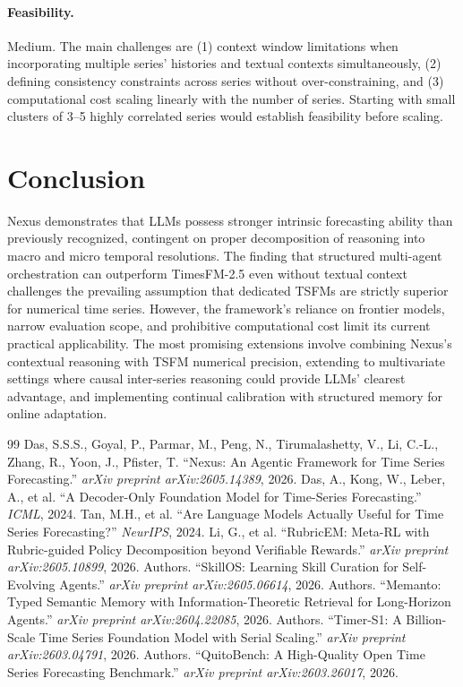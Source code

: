 \documentclass[11pt,a4paper]{article}
\begin{document}
\paragraph{Feasibility.} Medium. The main challenges are (1) context window limitations when incorporating multiple series' histories and textual contexts simultaneously, (2) defining consistency constraints across series without over-constraining, and (3) computational cost scaling linearly with the number of series. Starting with small clusters of 3--5 highly correlated series would establish feasibility before scaling.

\section{Conclusion}

Nexus demonstrates that LLMs possess stronger intrinsic forecasting ability than previously recognized, contingent on proper decomposition of reasoning into macro and micro temporal resolutions. The finding that structured multi-agent orchestration can outperform TimesFM-2.5 even without textual context challenges the prevailing assumption that dedicated TSFMs are strictly superior for numerical time series. However, the framework's reliance on frontier models, narrow evaluation scope, and prohibitive computational cost limit its current practical applicability. The most promising extensions involve combining Nexus's contextual reasoning with TSFM numerical precision, extending to multivariate settings where causal inter-series reasoning could provide LLMs' clearest advantage, and implementing continual calibration with structured memory for online adaptation.

\begin{thebibliography}{99}
 Das, S.S.S., Goyal, P., Parmar, M., Peng, N., Tirumalashetty, V., Li, C.-L., Zhang, R., Yoon, J., Pfister, T. ``Nexus: An Agentic Framework for Time Series Forecasting.'' \textit{arXiv preprint arXiv:2605.14389}, 2026.
 Das, A., Kong, W., Leber, A., et al. ``A Decoder-Only Foundation Model for Time-Series Forecasting.'' \textit{ICML}, 2024.
 Tan, M.H., et al. ``Are Language Models Actually Useful for Time Series Forecasting?'' \textit{NeurIPS}, 2024.
 Li, G., et al. ``RubricEM: Meta-RL with Rubric-guided Policy Decomposition beyond Verifiable Rewards.'' \textit{arXiv preprint arXiv:2605.10899}, 2026.
 Authors. ``SkillOS: Learning Skill Curation for Self-Evolving Agents.'' \textit{arXiv preprint arXiv:2605.06614}, 2026.
 Authors. ``Memanto: Typed Semantic Memory with Information-Theoretic Retrieval for Long-Horizon Agents.'' \textit{arXiv preprint arXiv:2604.22085}, 2026.
 Authors. ``Timer-S1: A Billion-Scale Time Series Foundation Model with Serial Scaling.'' \textit{arXiv preprint arXiv:2603.04791}, 2026.
 Authors. ``QuitoBench: A High-Quality Open Time Series Forecasting Benchmark.'' \textit{arXiv preprint arXiv:2603.26017}, 2026.
\end{thebibliography}
\end{document}
